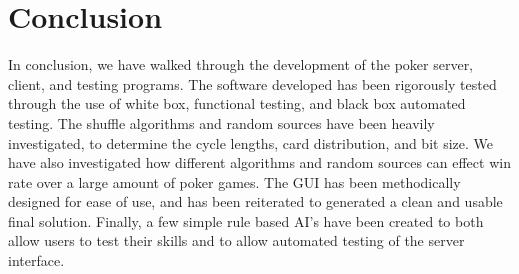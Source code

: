 \section{Conclusion}
In conclusion, we have walked through the development of the poker server,
client, and testing programs. The software developed has been rigorously
tested through the use of white box, functional testing, and black box
automated testing. The shuffle algorithms and random sources have been heavily
investigated, to determine the cycle lengths, card distribution, and bit size.
We have also investigated how different algorithms and random sources can
effect win rate over a large amount of poker games. The GUI has been
methodically designed for ease of use, and has been reiterated to generated
a clean and usable final solution. Finally, a few simple rule based AI's have
been created to both allow users to test their skills and to allow automated
testing of the server interface.
